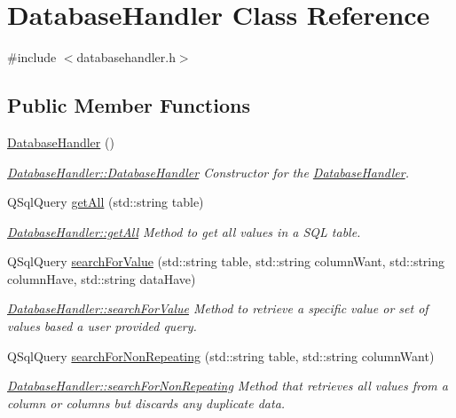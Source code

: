 \hypertarget{class_database_handler}{\section{Database\-Handler Class Reference}
\label{class_database_handler}
}


{\ttfamily \#include $<$databasehandler.\-h$>$}

\subsection*{Public Member Functions}
\begin{DoxyCompactItemize}
\item 
\hyperlink{class_database_handler_ac27357d3431faf4fd6810483a24a43fd}{Database\-Handler} ()
\begin{DoxyCompactList}\small\item\em \hyperlink{class_database_handler_ac27357d3431faf4fd6810483a24a43fd}{Database\-Handler\-::\-Database\-Handler} Constructor for the \hyperlink{class_database_handler}{Database\-Handler}. \end{DoxyCompactList}\item 
Q\-Sql\-Query \hyperlink{class_database_handler_a0e128b134e4b0af836ec0a89538f25e6}{get\-All} (std\-::string table)
\begin{DoxyCompactList}\small\item\em \hyperlink{class_database_handler_a0e128b134e4b0af836ec0a89538f25e6}{Database\-Handler\-::get\-All} Method to get all values in a S\-Q\-L table. \end{DoxyCompactList}\item 
Q\-Sql\-Query \hyperlink{class_database_handler_af32dd20a5004d4654c2adfd621be1266}{search\-For\-Value} (std\-::string table, std\-::string column\-Want, std\-::string column\-Have, std\-::string data\-Have)
\begin{DoxyCompactList}\small\item\em \hyperlink{class_database_handler_af32dd20a5004d4654c2adfd621be1266}{Database\-Handler\-::search\-For\-Value} Method to retrieve a specific value or set of values based a user provided query. \end{DoxyCompactList}\item 
Q\-Sql\-Query \hyperlink{class_database_handler_ab8e5417394837310592fb245a69b4d68}{search\-For\-Non\-Repeating} (std\-::string table, std\-::string column\-Want)
\begin{DoxyCompactList}\small\item\em \hyperlink{class_database_handler_ab8e5417394837310592fb245a69b4d68}{Database\-Handler\-::search\-For\-Non\-Repeating} Method that retrieves all values from a column or columns but discards any duplicate data. \end{DoxyCompactList}\item 

\end{DoxyCompactItemize}
